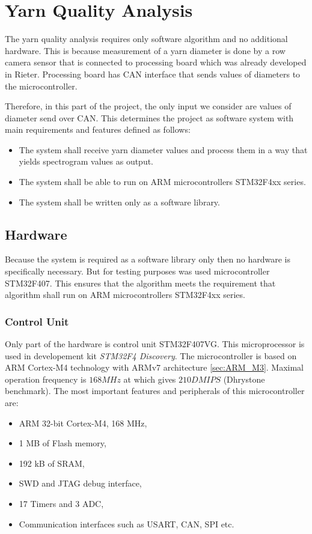 \documentclass[twoside]{ctuthesis}
\theoremstyle{plain}
\theoremstyle{definition}
\theoremstyle{note}
\begin{document}
\section{Yarn Quality Analysis}
The yarn quality analysis requires only software algorithm and no additional hardware. This is because measurement of a yarn diameter is done by a row camera sensor that is connected to processing board which was already developed in Rieter. Processing board has CAN interface that sends values of diameters to the microcontroller. 

Therefore, in this part of the project, the only input we consider are values of diameter send over CAN. This determines the project as software system with main requirements and features defined as follows:
\begin{itemize}
	\setlength{\itemsep}{5pt}
	\item The system shall receive yarn diameter values and process them in a way that yields spectrogram values as output.
	\item The system shall be able to run on ARM microcontrollers STM32F4xx series.
	\item The system shall be written only as a software library.
\end{itemize}

\subsection{Hardware}
Because the system is required as a software library only then no hardware is specifically necessary. But for testing purposes was used microcontroller STM32F407. This ensures that the algorithm meets the requirement that algorithm shall run on ARM microcontrollers STM32F4xx series.
\subsubsection{Control Unit}
\label{sec:microControllerYarn}
Only part of the hardware is control unit STM32F407VG. This microprocessor is used in developement kit \textit{STM32F4 Discovery}.
The microcontroller is based on ARM Cortex-M4 technology with ARMv7 architecture \ref{sec:ARM_M3}. Maximal operation frequency is $168 MHz$ at which gives $210 DMIPS$ (Dhrystone benchmark). The most important features and peripherals of this microcontroller are:
\begin{itemize}
	\setlength{\itemsep}{5pt}
	\item ARM 32-bit Cortex-M4, 168 MHz,
	\item 1 MB of Flash memory,
	\item 192 kB of SRAM,
	\item SWD and JTAG debug interface,
	\item 17 Timers and 3 ADC,
	\item Communication interfaces such as USART, CAN, SPI etc.
\end{itemize}	
\end{document}

